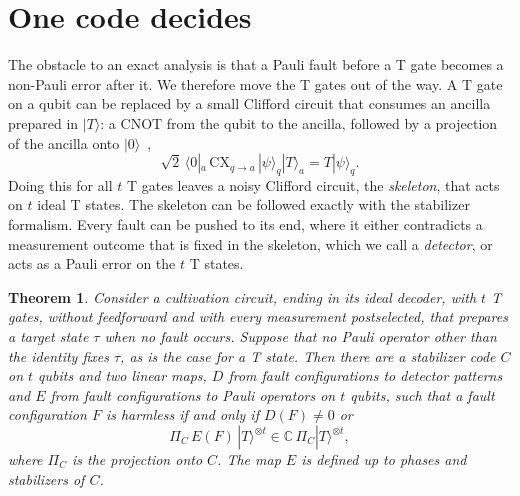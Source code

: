 \documentclass[aps,prl,reprint,twocolumn,amsmath,amssymb,floatfix,nofootinbib,superscriptaddress]{revtex4-2}
\newtheorem{theorem}{Theorem}
\theoremstyle{definition}
\theoremstyle{remark}
\begin{document}
\section{One code decides}
The obstacle to an exact analysis is that a Pauli fault before a T gate becomes a non-Pauli error after it. We therefore move the T gates out of the way. A T gate on a qubit can be replaced by a small Clifford circuit that consumes an ancilla prepared in $|T\rangle$: a CNOT from the qubit to the ancilla, followed by a projection of the ancilla onto $|0\rangle$~\cite{zhouleungchuang},
\begin{equation}
 \sqrt2\,\langle0|_a\,\mathrm{CX}_{q\to a}\,|\psi\rangle_q|T\rangle_a=T|\psi\rangle_q .
 \label{eq:gadget}
\end{equation}
Doing this for all $t$ T gates leaves a noisy Clifford circuit, the \emph{skeleton}, that acts on $t$ ideal T states. The skeleton can be followed exactly with the stabilizer formalism. Every fault can be pushed to its end, where it either contradicts a measurement outcome that is fixed in the skeleton, which we call a \emph{detector}, or acts as a Pauli error on the $t$ T states.
\begin{theorem}\label{thm:main}
Consider a cultivation circuit, ending in its ideal decoder, with $t$ T gates, without feedforward and with every measurement postselected, that prepares a target state $\tau$ when no fault occurs. Suppose that no Pauli operator other than the identity fixes $\tau$, as is the case for a T state. Then there are a stabilizer code $C$ on $t$ qubits and two linear maps, $D$ from fault configurations to detector patterns and $E$ from fault configurations to Pauli operators on $t$ qubits, such that a fault configuration $F$ is harmless if and only if $D(F)\neq0$ or
\begin{equation}
 \Pi_C\,E(F)\,|T\rangle^{\otimes t}\in\mathbb C\,\Pi_C|T\rangle^{\otimes t},
 \label{eq:collapse}
\end{equation}
where $\Pi_C$ is the projection onto $C$. The map $E$ is defined up to phases and stabilizers of $C$.
\end{theorem}
\end{document}
